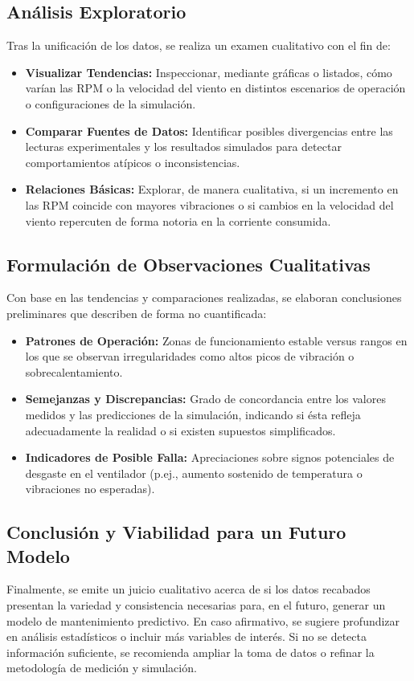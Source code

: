 \subsection{Análisis Exploratorio}
Tras la unificación de los datos, se realiza un examen cualitativo con el fin de:
\begin{itemize}
    \item \textbf{Visualizar Tendencias:} Inspeccionar, mediante gráficas o listados, cómo varían las RPM o la velocidad del viento en distintos escenarios de operación o configuraciones de la simulación.
    \item \textbf{Comparar Fuentes de Datos:} Identificar posibles divergencias entre las lecturas experimentales y los resultados simulados para detectar comportamientos atípicos o inconsistencias.
    \item \textbf{Relaciones Básicas:} Explorar, de manera cualitativa, si un incremento en las RPM coincide con mayores vibraciones o si cambios en la velocidad del viento repercuten de forma notoria en la corriente consumida.
\end{itemize}

\subsection{Formulación de Observaciones Cualitativas}
Con base en las tendencias y comparaciones realizadas, se elaboran conclusiones preliminares que describen de forma no cuantificada:
\begin{itemize}
    \item \textbf{Patrones de Operación:} Zonas de funcionamiento estable versus rangos en los que se observan irregularidades como altos picos de vibración o sobrecalentamiento.
    \item \textbf{Semejanzas y Discrepancias:} Grado de concordancia entre los valores medidos y las predicciones de la simulación, indicando si ésta refleja adecuadamente la realidad o si existen supuestos simplificados.
    \item \textbf{Indicadores de Posible Falla:} Apreciaciones sobre signos potenciales de desgaste en el ventilador (p.ej., aumento sostenido de temperatura o vibraciones no esperadas).
\end{itemize}

\subsection{Conclusión y Viabilidad para un Futuro Modelo}
Finalmente, se emite un juicio cualitativo acerca de si los datos recabados presentan la variedad y consistencia necesarias para, en el futuro, generar un modelo de mantenimiento predictivo. En caso afirmativo, se sugiere profundizar en análisis estadísticos o incluir más variables de interés. Si no se detecta información suficiente, se recomienda ampliar la toma de datos o refinar la metodología de medición y simulación.

